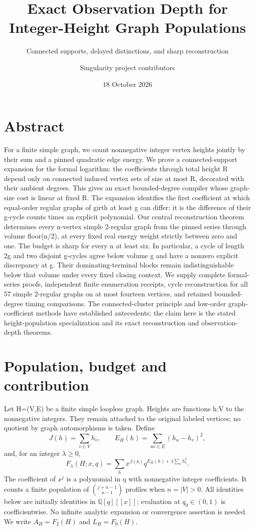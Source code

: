 \documentclass[
  11pt,
  a4paper,
]{article}
\title{Exact Observation Depth for Integer-Height Graph Populations}
\subtitle{Connected supports, delayed distinctions, and sharp
reconstruction}
\author{Singularity project contributors}
\date{18 October 2026}
\begin{document}
\maketitle

\hypertarget{abstract}{%
\section*{Abstract}\label{abstract}}

For a finite simple graph, we count nonnegative integer vertex heights
jointly by their sum and a pinned quadratic edge energy. We prove a
connected-support expansion for the formal logarithm: the coefficients
through total height R depend only on connected induced vertex sets of
size at most R, decorated with their ambient degrees. This gives an
exact bounded-degree compiler whose graph-size cost is linear at fixed
R. The expansion identifies the first coefficient at which equal-order
regular graphs of girth at least g can differ: it is the difference of
their g-cycle counts times an explicit polynomial. Our central
reconstruction theorem determines every n-vertex simple 2-regular graph
from the pinned series through volume floor(n/2), at every fixed real
energy weight strictly between zero and one. The budget is sharp for
every n at least six. In particular, a cycle of length 2g and two
disjoint g-cycles agree below volume g and have a nonzero explicit
discrepancy at g. Their dominating-terminal blocks remain
indistinguishable below that volume under every fixed closing context.
We supply complete formal-series proofs, independent finite enumeration
receipts, cycle reconstruction for all 57 simple 2-regular graphs on at
most fourteen vertices, and retained bounded-degree timing comparisons.
The connected-cluster principle and low-order graph-coefficient methods
have established antecedents; the claim here is the stated
height-population specialization and its exact reconstruction and
observation-depth theorems.

\hypertarget{population-budget-and-contribution}{%
\section{Population, budget and
contribution}\label{population-budget-and-contribution}}

Let H=(V,E) be a finite simple loopless graph. Heights are functions h:V
to the nonnegative integers. They remain attached to the original
labeled vertices; no quotient by graph automorphisms is taken. Define \[
J(h)=\sum_{v\in V}h_v,\qquad
E_H(h)=\sum_{uv\in E}(h_u-h_v)^2,
\] and, for an integer \(\lambda\ge0\), \[
F_\lambda(H;x,q)=\sum_h x^{J(h)}q^{E_H(h)+\lambda\sum_vh_v^2}.
\tag{1}
\] The coefficient of \(x^j\) is a polynomial in q with nonnegative
integer coefficients. It counts a finite population of
\(\binom{j+n-1}{n-1}\) profiles when \(n=|V|>0\). All identities below
are initially identities in \(\mathbb Q[q][[x]]\); evaluation at
\(q_0\in(0,1)\) is coefficientwise. No infinite analytic expansion or
convergence assertion is needed. We write \(A_H=F_2(H)\) and
\(L_H=F_0(H)\).
\end{document}
